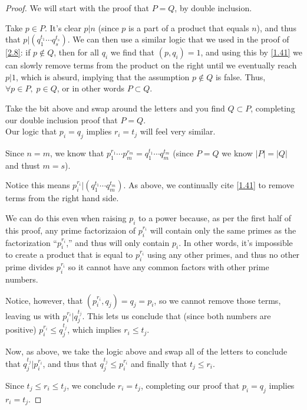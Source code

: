 \documentclass[../main.tex]{subfiles}
\begin{document}
\begin{proof}
  We will start with the proof that $P = Q$, by double inclusion.

  Take $p \in P$. It's clear $p | n$ (since $p$ is a part of a product that equals $n$), and thus that $p | (q_1^{t_1} \cdots q_s^{t_s})$. We can then use a similar logic that we used in the proof of \ref{2.8}: if $p \not \in Q$, then for all $q_i$ we find that $(p, q_i) = 1$, and using this by \ref{1.41} we can slowly remove terms from the product on the right until we eventually reach $p | 1$, which is absurd, implying that the assumption $p \not \in Q$ is false. Thus, $\forall p \in P, \; p \in Q$, or in other words $P \subset Q$.

  Take the bit above and swap around the letters and you find $Q \subset P$, completing our double inclusion proof that $P = Q$. \\[0ex]

   Our logic that $p_i = q_j$ implies $r_i = t_j$ will feel very similar.

   Since $n=m$, we know that $p_1^{r_1} \cdots p_m^{r_m} = q_1^{t_1} \cdots q_m^{t_m}$ (since $P = Q$ we know $|P| = |Q|$ and thust $m = s$).

   Notice this means $p_i^{r_i} | (q_1^{t_1} \cdots q_m^{t_m})$. As above, we continually cite \ref{1.41} to remove terms from the right hand side.

   We can do this even when raising $p_i$ to a power because, as per the first half of this proof, any prime factorizaion of $p_i^{r_i}$ will contain only the same primes as the factorization ``$p_i^{r_i}$,'' and thus will only contain $p_i$. In other words, it's impossible to create a product that is equal to $p_i^{r_i}$ using any other primes, and thus no other prime divides $p_i^{r_i}$ so it cannot have any common factors with other prime numbers.

   Notice, however, that $(p_i^{r_i}, q_j) = q_j = p_i$, so we cannot remove those terms, leaving us with $p_i^{r_i} | q_j^{t_j}$. This lets us conclude that (since both numbers are positive) $p_i^{r_i} \leq q_j^{t_j}$, which implies $r_i \leq t_j$.

   Now, as above, we take the logic above and swap all of the letters to conclude that $q_j^{t_j} | p_i^{r_i}$, and thus that $q_j^{t_j} \leq p_i^{r_i}$ and finally that $t_j \leq r_i$.

   Since $t_j \leq r_i \leq t_j$, we conclude $r_i = t_j$, completing our proof that $p_i = q_j$ implies $r_i = t_j$.
\end{proof}
\end{document}
